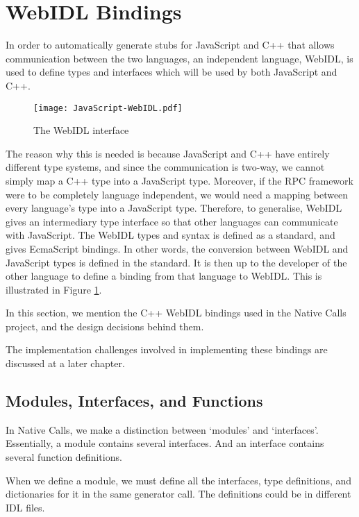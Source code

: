 \section{WebIDL Bindings} %
\label{sec:webidl_bindings}

In order to automatically generate stubs for JavaScript and C++ that allows communication between the two languages, an independent language, WebIDL, is used to define types and interfaces which will be used by both JavaScript and C++.

\begin{figure}
    \centering
    \texttt{[image: JavaScript-WebIDL.pdf]} 
    \caption{The WebIDL interface}
    \label{fig:webidl_intreface}
\end{figure}

The reason why this is needed is because JavaScript and C++ have entirely different type systems, and since the communication is two-way, we cannot simply map a C++ type into a JavaScript type. Moreover, if the RPC framework were to be completely language independent, we would need a mapping between every language's type into a JavaScript type. Therefore, to generalise, WebIDL gives an intermediary type interface so that other languages can communicate with JavaScript. The WebIDL types and syntax is defined as a standard, and gives EcmaScript bindings. In other words, the conversion between WebIDL and JavaScript types is defined in the standard. It is then up to the developer of the other language to define a binding from that language to WebIDL. This is illustrated in Figure \ref{fig:webidl_intreface}.

In this section, we mention the C++ WebIDL bindings used in the Native Calls project, and the design decisions behind them.

The implementation challenges involved in implementing these bindings are discussed at a later chapter.

\subsection{Modules, Interfaces, and Functions} %
\label{sub:modules_and_interfaces}
In Native Calls, we make a distinction between `modules' and `interfaces'. Essentially, a module contains several interfaces. And an interface contains several function definitions.

When we define a module, we must define all the interfaces, type definitions, and dictionaries for it in the same generator call. The definitions could be in different IDL files.

